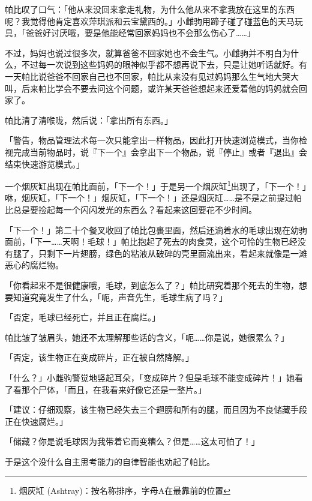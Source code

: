 帕比叹了口气：「他从来没回来拿走礼物，为什么他从来不拿我放在这里的东西呢？我觉得他肯定喜欢萍琪派和云宝黛西的。」小雌驹用蹄子碰了碰蓝色的天马玩具，「爸爸好讨厌哦，要是他能经常回家妈妈也不会那么伤心了……」

不过，妈妈也说过很多次，就算爸爸不回家她也不会生气。小雌驹并不明白为什么，不过每一次说到这些妈妈的眼神似乎都不想再说下去，只是让她听话就好。有一天帕比说爸爸不回家自己也不回家，帕比从来没有见过妈妈那么生气地大哭大叫，后来帕比学会不要去问这个问题，或许某天爸爸想起来还爱着他的妈妈就会回家了。

帕比清了清喉咙，然后说：「拿出所有东西。」

「{\mt 警告，物品管理法术每一次只能拿出一样物品，因此打开快速浏览模式，当你检视完成当前物品时，说『下一个』会拿出下一个物品，说『停止』或者『退出』会结束快速游览模式。}」

一个烟灰缸出现在帕比面前，「下一个！」于是另一个烟灰缸\footnote{烟灰缸 (Ashtray)：按名称排序，字母A在最靠前的位置}出现了，「下一个！」咻，烟灰缸，「下一个！」烟灰缸，「下一个！」还是烟灰缸……是不是之前提过帕比总是要捡起每一个闪闪发光的东西么？看起来这回要花不少时间。

\horizonline


「下一个！」第二十个餐叉收回了帕比包裹里面，然后还滴着水的毛球出现在幼驹面前，「下一……天啊！毛球！」帕比抱起了死去的肉食灵，这个可怜的生物已经没有腿了，只剩下一片翅膀，绿色的粘液从破碎的壳里面流出来，看起来就像是一滩恶心的腐烂物。

「你看起来不是很健康哦，毛球，到底怎么了？」帕比研究着那个死去的生物，想要知道究竟发生了什么，「呃，声音先生，毛球生病了吗？」

「{\mt 否定，毛球已经死亡，并且正在腐烂。}」

帕比皱了皱眉头，她还不太理解那些话的含义，「呃……你是说，她很累么？」

「{\mt 否定，该生物正在变成碎片，正在被自然降解。}」

「什么？」小雌驹警觉地竖起耳朵，「变成碎片？但是毛球不能变成碎片！」她看了看那个尸体，「而且，在我看来好像它还是一整片。」

「{\mt 建议：仔细观察，该生物已经失去三个翅膀和所有的腿，而且因为不良储藏手段正在快速腐烂。}」

「储藏？你是说毛球因为我带着它而变糟么？但是……这太可怕了！」

于是这个没什么自主思考能力的自律智能也劝起了帕比。

